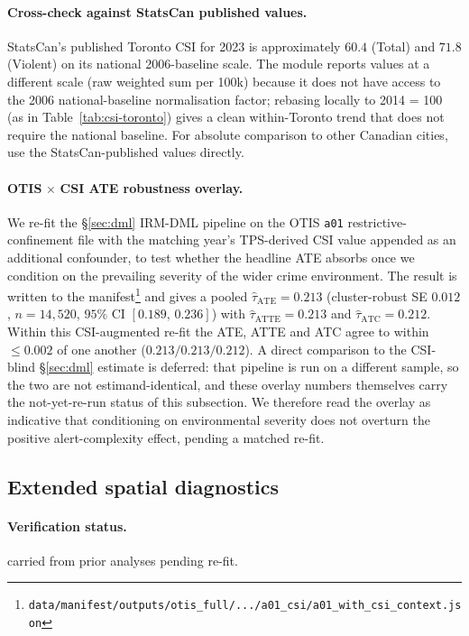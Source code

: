 \documentclass[article,shortnames,nojss]{jss}
\begin{document}
\paragraph{Cross-check against StatsCan published values.}
StatsCan's published Toronto CSI for 2023 is approximately $60.4$
(Total) and $71.8$ (Violent) on its national 2006-baseline scale.
The  module reports values at a different scale (raw
weighted sum per 100k) because it does not have access to the
2006 national-baseline normalisation factor; rebasing locally to
2014 = 100 (as in Table~\ref{tab:csi-toronto}) gives a clean
within-Toronto trend that does not require the national baseline.
For absolute comparison to other Canadian cities, use the
StatsCan-published values directly.

\paragraph{OTIS$\,\times\,$CSI ATE robustness overlay.}
We re-fit the §\ref{sec:dml} IRM-DML pipeline on the OTIS
\texttt{a01} restrictive-confinement file with the matching
year's TPS-derived CSI value appended as an additional confounder,
to test whether the headline ATE absorbs once we condition on the
prevailing severity of the wider crime environment.  The result is
written to the manifest\footnote{\texttt{data/manifest/outputs/otis\_full/.../a01\_csi/a01\_with\_csi\_context.json}}
and gives a pooled $\hat\tau_{\text{ATE}} = 0.213$ (cluster-robust
SE $0.012$, $n=14{,}520$, $95\%$ CI $[0.189,\,0.236]$) with
$\hat\tau_{\text{ATTE}}=0.213$ and $\hat\tau_{\text{ATC}}=0.212$.
Within this CSI-augmented re-fit the ATE, ATTE and ATC agree to
within $\le 0.002$ of one another ($0.213/0.213/0.212$).  A direct
comparison to the CSI-blind §\ref{sec:dml} estimate is deferred:
that pipeline is run on a different sample, so the two are not
estimand-identical, and these overlay numbers themselves carry the
not-yet-re-run status of this subsection.  We therefore read the
overlay as indicative that conditioning on environmental severity
does not overturn the positive alert-complexity effect, pending a
matched re-fit.

\subsection{Extended spatial diagnostics}\label{phys-spatial-extended}


\paragraph*{Verification status.}
carried from prior analyses pending re-fit.
\end{document}
